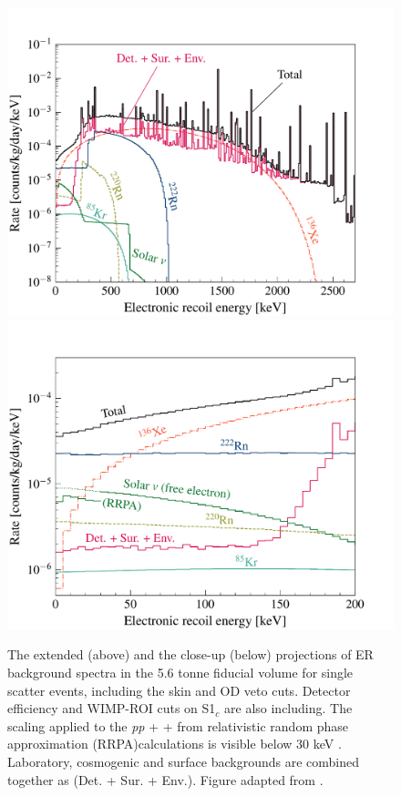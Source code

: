 %
\begin{figure}[t!]
    \centering
    \includegraphics[scale=0.5]{Chapter_5/Figures/er_background_spectrum.pdf}
    \includegraphics[scale=0.5]{Chapter_5/Figures/er_background_spectrum_zoomed.pdf}
    \caption[The extended (above) and the close-up (below) projections of ER background spectra in the 5.6 tonne fiducial volume for single scatter events, including the skin and OD veto cuts.]%
    {The extended (above) and the close-up (below) projections of ER background spectra in the 5.6 tonne fiducial volume for single scatter events, including the skin and OD veto cuts. Detector efficiency and WIMP-ROI cuts on S1$_{c}$ are also including. The scaling applied to the \textit{pp} + \BeS{} + \NOT{} from relativistic random phase approximation (RRPA)calculations is visible below 30 keV \cite{Chen_2017}. Laboratory, cosmogenic and surface backgrounds are combined together as (Det. + Sur. + Env.). Figure adapted from \cite{akerib2018projected}.}
    \label{fig:lz_er_spectrum}
\end{figure}
%


